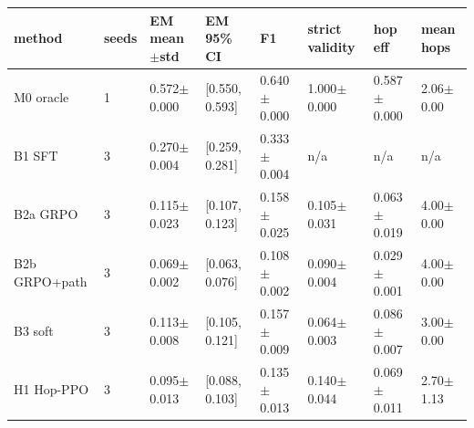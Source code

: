 \begin{tabular}{llllllll}
\toprule
method & seeds & EM mean$\pm$std & EM 95\% CI & F1 & strict validity & hop eff & mean hops \\
\midrule
M0 oracle & 1 & 0.572$\pm$0.000 & [0.550, 0.593] & 0.640$\pm$0.000 & 1.000$\pm$0.000 & 0.587$\pm$0.000 & 2.06$\pm$0.00 \\
B1 SFT & 3 & 0.270$\pm$0.004 & [0.259, 0.281] & 0.333$\pm$0.004 & n/a & n/a & n/a \\
B2a GRPO & 3 & 0.115$\pm$0.023 & [0.107, 0.123] & 0.158$\pm$0.025 & 0.105$\pm$0.031 & 0.063$\pm$0.019 & 4.00$\pm$0.00 \\
B2b GRPO+path & 3 & 0.069$\pm$0.002 & [0.063, 0.076] & 0.108$\pm$0.002 & 0.090$\pm$0.004 & 0.029$\pm$0.001 & 4.00$\pm$0.00 \\
B3 soft & 3 & 0.113$\pm$0.008 & [0.105, 0.121] & 0.157$\pm$0.009 & 0.064$\pm$0.003 & 0.086$\pm$0.007 & 3.00$\pm$0.00 \\
H1 Hop-PPO & 3 & 0.095$\pm$0.013 & [0.088, 0.103] & 0.135$\pm$0.013 & 0.140$\pm$0.044 & 0.069$\pm$0.011 & 2.70$\pm$1.13 \\
\bottomrule
\end{tabular}
